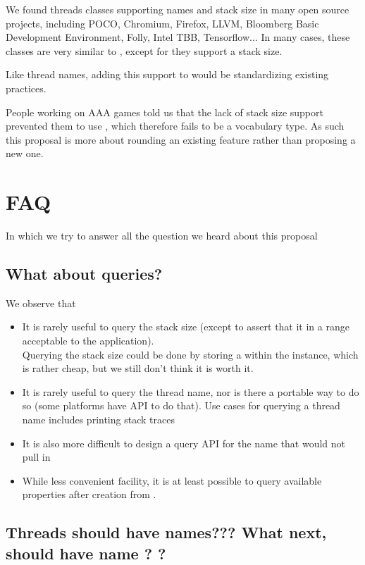 \documentclass{wg21}
\begin{document}
We found threads classes supporting names and stack size in many open source projects, including POCO, Chromium, Firefox, LLVM, Bloomberg Basic Development Environment, Folly, Intel TBB, Tensorflow...
In many cases, these classes are very similar to , except for they support a stack size.

Like thread names, adding this support to  would be standardizing existing practices.

People working on AAA games told us that the lack of stack size support prevented them to use , which therefore fails to be a vocabulary type.
As such this proposal is more about rounding an existing feature rather than proposing a new one.

\section{FAQ}

In which we try to answer all the question we heard about this proposal

\subsection{What about queries?}

We observe that
\begin{itemize}
\item It is rarely useful to query the stack size (except to assert that it in a range acceptable to the application).\\
Querying the stack size could be done by storing a  within the  instance, which is rather cheap,
but we still don't think it is worth it.
\item It is rarely useful to query the thread name, nor is there a portable way to do so (some platforms have API to do that). Use cases for querying a thread name includes printing stack traces \cite{P0881R5}\\
\item It is also more difficult to design a query API for the name that would not pull in 
\item While less convenient facility, it is at least possible to query available properties after creation from .
\end{itemize}


\subsection{Threads should have names??? What next,  should have name ? ?}
\end{document}
